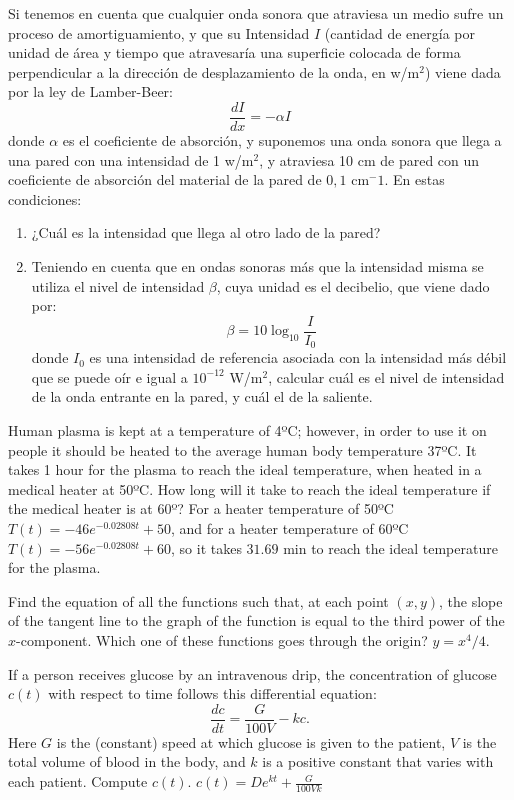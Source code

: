 {Si tenemos en cuenta que cualquier onda sonora que atraviesa un medio sufre un proceso de amortiguamiento, y que su
Intensidad $I$ (cantidad de energía por unidad de área y tiempo que atravesaría una superficie colocada de forma
perpendicular a la dirección de desplazamiento de la onda, en w/m$^2$) viene dada por la ley de Lamber-Beer:
\[
\frac{{dI}}{{dx}} =  - \alpha I
\]
donde $\alpha$ es el coeficiente de absorción, y suponemos una onda sonora que llega a una pared con una intensidad de 1 w/m$^2$, y atraviesa 10 cm de pared con un coeficiente de absorción del material de la pared de $0,1$ cm$^-1$. En estas condiciones:
\begin{enumerate}
\item ¿Cuál es la intensidad que llega al otro lado de la pared?
\item Teniendo en cuenta que en ondas sonoras más que la intensidad misma se utiliza el nivel de intensidad $\beta$, cuya unidad es el decibelio, que viene dado por:
\[
\beta  = 10\log _{10} \frac{I}{{I_0 }}
\]
donde $I_0$ es una intensidad de referencia asociada con la intensidad más débil que se puede oír e igual a $10^{-12}$ W/m$^2$, calcular cuál es el nivel de intensidad de la onda entrante en la pared, y cuál el de la saliente.
\end{enumerate}
}
{
}
{}


{Human plasma is kept at a temperature of 4ºC; however, in order to use it on people it should be heated to the average human body temperature 37ºC.
It takes 1 hour for the plasma to reach the ideal temperature, when heated in a medical heater at 50ºC.
How long will it take to reach the ideal temperature if the medical heater is at 60º?
}
{For a heater temperature of 50ºC $T(t)=-46e^{-0.02808t}+50$, and for a heater temperature of 60ºC $T(t)=-56e^{-0.02808t}+60$, so it takes $31.69$ min to reach the ideal temperature for the plasma.}
{}


{Find the equation of all the functions such that, at each point $(x,y)$,
the slope of the tangent line to the graph of the function is equal to the third power of the
$x$-component.
Which one of these functions goes through the origin?
}
{$y=x^4/4$.
}
{}


{If a person receives glucose by an intravenous drip, the concentration of glucose $c(t)$ with respect to time follows this differential equation:
\[
\frac{dc}{dt}=\frac{G}{100V}-kc.
\]
Here $G$ is the (constant) speed at which glucose is given to the patient, $V$ is the total volume of blood in the body, and $k$ is a positive constant that varies with each patient.
Compute $c(t)$.
}
{$c(t)=De^{kt}+\frac{G}{100Vk}$
}
{}


